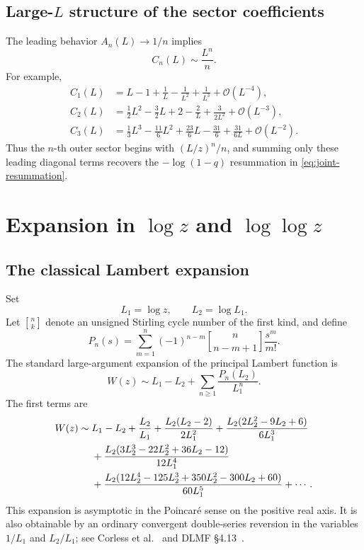 \documentclass[11pt,a4paper]{article}
\numberwithin{equation}{section}
\theoremstyle{definition}
\theoremstyle{remark}
\newcommand{\Ord}{\mathcal O}
\newcommand{\Lone}{L_1}
\newcommand{\Ltwo}{L_2}
\newcommand{\Acoef}{A}
\newcommand{\Ccoef}{C}
\newcommand{\stirlingone}[2]{\genfrac{[}{]}{0pt}{}{#1}{#2}}
\begin{document}
\subsection[Large-L structure of the sector coefficients]{Large-\(L\) structure of the sector coefficients}

The leading behavior \(\Acoef_n(L)\to1/n\) implies
\begin{equation}\label{eq:C-leading}
  \Ccoef_n(L)\sim\frac{L^n}{n}.
\end{equation}
For example,
\begin{align}
 \Ccoef_1(L)&=L-1+\frac1L-\frac1{L^2}+\frac1{L^3}+\Ord(L^{-4}),
 \label{eq:C1-largeL}\\
 \Ccoef_2(L)&=\frac12L^2-\frac32L+2-\frac2L
 +\frac{3}{2L^2}+\Ord(L^{-3}),
 \label{eq:C2-largeL}\\
 \Ccoef_3(L)&=\frac13L^3-\frac{11}{6}L^2+\frac{23}{6}L
 -\frac{31}{6}+\frac{31}{6L}+\Ord(L^{-2}).
 \label{eq:C3-largeL}
\end{align}
Thus the \(n\)-th outer sector begins with
\((L/z)^n/n\), and summing only these leading diagonal terms recovers the
\(-\log(1-q)\) resummation in \eqref{eq:joint-resummation}.

\section[Expansion in log z and log log z]{Expansion in \(\log z\) and \(\log\log z\)}

\subsection{The classical Lambert expansion}

Set
\begin{equation}\label{eq:L1-L2}
  \Lone=\log z,
  \qquad \Ltwo=\log\Lone.
\end{equation}
Let \(\stirlingone{n}{k}\) denote an unsigned Stirling cycle number
of the first kind, and define
\begin{equation}\label{eq:Pn-def}
  P_n(s)=\sum_{m=1}^{n}(-1)^{n-m}
  \stirlingone{n}{n-m+1}\frac{s^m}{m!}.
\end{equation}
The standard large-argument expansion of the principal Lambert function is
\begin{equation}\label{eq:W-Stirling}
  W(z)\sim \Lone-\Ltwo+
  \sum_{n\ge1}\frac{P_n(\Ltwo)}{\Lone^n}.
\end{equation}
The first terms are
\begin{align}
 W(z)\sim{}&\Lone-\Ltwo+\frac{\Ltwo}{\Lone}
 +\frac{\Ltwo(\Ltwo-2)}{2\Lone^2}
 +\frac{\Ltwo(2\Ltwo^2-9\Ltwo+6)}{6\Lone^3}
 \notag\\
 &+\frac{\Ltwo(3\Ltwo^3-22\Ltwo^2+36\Ltwo-12)}{12\Lone^4}
 \notag\\
 &+\frac{\Ltwo(12\Ltwo^4-125\Ltwo^3+350\Ltwo^2-300\Ltwo+60)}
 {60\Lone^5}
 +\cdots.
 \label{eq:W-explicit}
\end{align}
This expansion is asymptotic in the Poincar\'e sense on the positive real
axis.  It is also obtainable by an ordinary convergent double-series
reversion in the variables \(1/\Lone\) and \(\Ltwo/\Lone\); see
Corless et al.~\cite{Corless1996} and DLMF \S4.13~\cite{DLMF}.
\end{document}
